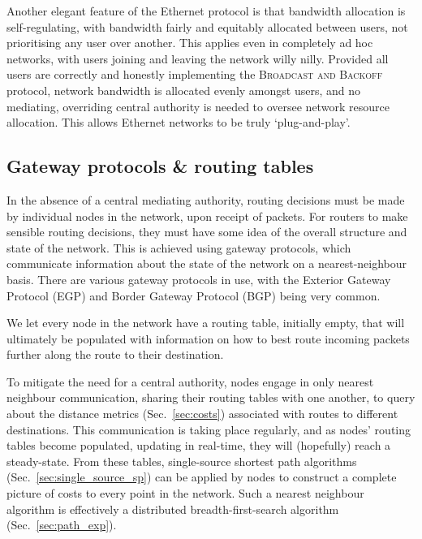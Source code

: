Another elegant feature of the Ethernet protocol is that bandwidth allocation is self-regulating, with bandwidth fairly and equitably allocated between users, not prioritising any user over another. This applies even in completely ad hoc networks, with users joining and leaving the network willy nilly. Provided all users are correctly and honestly implementing the \textsc{Broadcast and Backoff} protocol, network bandwidth is allocated evenly amongst users, and no mediating, overriding central authority is needed to oversee network resource allocation. This allows Ethernet networks to be truly `plug-and-play'.

%
%

\subsection{Gateway protocols \& routing tables} \label{sec:gateway}  

In the absence of a central mediating authority, routing decisions must be made by individual nodes in the network, upon receipt of packets. For routers to make sensible routing decisions, they must have some idea of the overall structure and state of the network. This is achieved using gateway protocols, which communicate information about the state of the network on a nearest-neighbour basis. There are various gateway protocols in use, with the Exterior Gateway Protocol (EGP) and Border Gateway Protocol (BGP) being very common.

We let every node in the network have a routing table, initially empty, that will ultimately be populated with information on how to best route incoming packets further along the route to their destination.

To mitigate the need for a central authority, nodes engage in only nearest neighbour communication, sharing their routing tables with one another, to query about the distance metrics (Sec.~\ref{sec:costs}) associated with routes to different destinations. This communication is taking place regularly, and as nodes' routing tables become populated, updating in real-time, they will (hopefully) reach a steady-state. From these tables, single-source shortest path algorithms (Sec.~\ref{sec:single_source_sp}) can be applied by nodes to construct a complete picture of costs to every point in the network. Such a nearest neighbour algorithm is effectively a distributed breadth-first-search algorithm (Sec.~\ref{sec:path_exp}).

